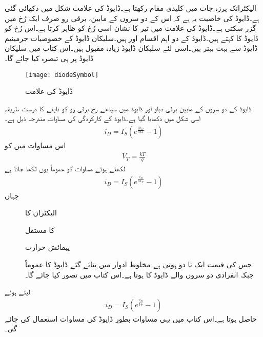 
الیکٹرانک پرزہ جات میں   کلیدی مقام رکھتا ہے۔ڈایوڈ کی علامت شکل   میں دکھائی گئی ہے۔ڈایوڈ کی خاصیت یہ ہے کہ اس کے دو سروں کے مابین، برقی رو صرف ایک رُخ میں گزر سکتی ہے۔ڈایوڈ  کی علامت میں تیر کا نشان اسی رُخ کو ظاہر کرتا ہے۔اس رُخ کو ڈایوڈ کا   کہتے ہیں۔ڈایوڈ کے دو اہم اقسام  اور  ہیں۔سلیکان ڈایوڈ کے خصوصیات جرمینیم ڈایوڈ سے بہت بہتر ہیں۔اسی لئے سلیکان ڈایوڈ زیادہ مقبول ہیں۔اس کتاب میں سلیکان ڈایوڈ پر ہی تبصرہ کیا جائے گا۔  
\begin{figure}
\centering
\texttt{[image: diodeSymbol]}
\caption{ڈایوڈ کی علامت}
\label{شکل_ڈایوڈ_کی_علامت}
\end{figure}
ڈایوڈ کے دو سروں کے مابین برقی دباو   اور ڈایوڈ  میں سیدھے رخ  برقی رو  کو ناپنے کا درست طریقہ اسی شکل میں دکھایا گیا ہے۔ڈایوڈ کے کارکردگی کی  مساوات مندرجہ ذیل ہے۔
\begin{align}
i_D=I_S \left (e^{\frac{q v_D}{n k T}}-1 \right )
\end{align}
اس مساوات میں   کو
\begin{align}
V_T=\frac{k T}{q}
\end{align}
لکھتے ہوئے مساوات کو عموماً یوں لکھا جاتا ہے
\begin{align} \label{مساوات_ڈایوڈ_کی_مکمل_مساوات}
i_D=I_S \left (e^{\frac{v_D}{n V_T}}-1 \right )
\end{align}
جہاں
\begin{description}
\item
[]  
\item
[]  الیکٹران کا  
\item
[]   کا مستقل
\item
[]   پیمائش حرارت
\item
[] 
\item
[]   جس کی قیمت ایک تا دو ہوتی ہے۔مخلوط ادوار میں بنائے گئے ڈایوڈ کا عموماً  جبکہ انفرادی دو سروں والے ڈایوڈ کا  ہوتا ہے۔اس کتاب میں  تصور کیا جائے گا۔ 

\end{description}
 لیتے ہوئے
\begin{align} \label{مساوات_ڈایوڈ_کی_مساوات}
i_D=I_S \left (e^{\frac{v_D}{V_T}}-1 \right )
\end{align}
حاصل ہوتا ہے۔اس کتاب میں یہی مساوات بطور ڈایوڈ کی مساوات استعمال کی جائے گی۔

